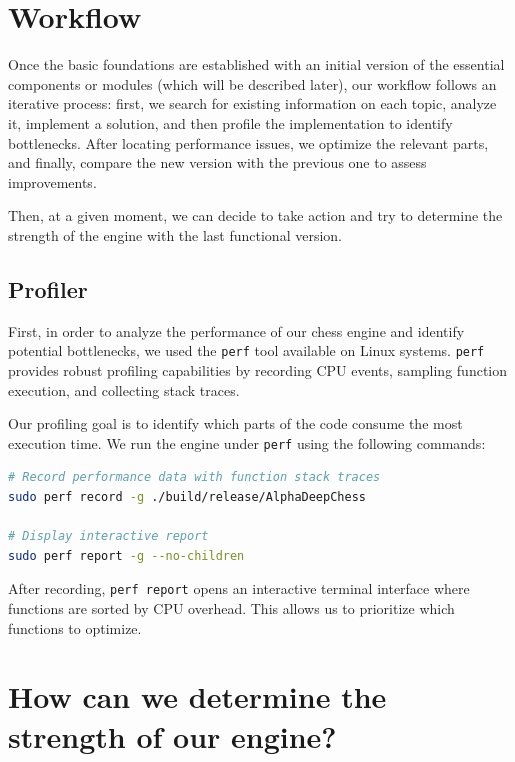 \section{Workflow}

Once the basic foundations are established with an initial version of the essential components or modules (which will be described later), our workflow follows an iterative process: first, we search for existing information on each topic, analyze it, implement a solution, and then profile the implementation to identify bottlenecks. After locating performance issues, we optimize the relevant parts, and finally, compare the new version with the previous one to assess improvements.

\vspace{1em}

\noindent Then, at a given moment, we can decide to take action and try to determine the strength of the engine with the last functional version.

\subsection{Profiler}

First, in order to analyze the performance of our chess engine and identify potential bottlenecks, we used the \texttt{perf} tool available on Linux systems. \texttt{perf} provides robust profiling capabilities by recording CPU events, sampling function execution, and collecting stack traces.

\vspace{1em}

\noindent Our profiling goal is to identify which parts of the code consume the most execution time. We run the engine under \texttt{perf} using the following commands:

\begin{lstlisting}[language=bash, caption={Profiling AlphaDeepChess with perf}, captionpos=b, frame=single, breaklines=true]
# Record performance data with function stack traces
sudo perf record -g ./build/release/AlphaDeepChess

# Display interactive report
sudo perf report -g --no-children
\end{lstlisting}

\noindent After recording, \texttt{perf report} opens an interactive terminal interface where functions are sorted by CPU overhead. This allows us to prioritize which functions to optimize.

\section{How can we determine the strength of our engine?}
\label{sec:how}

